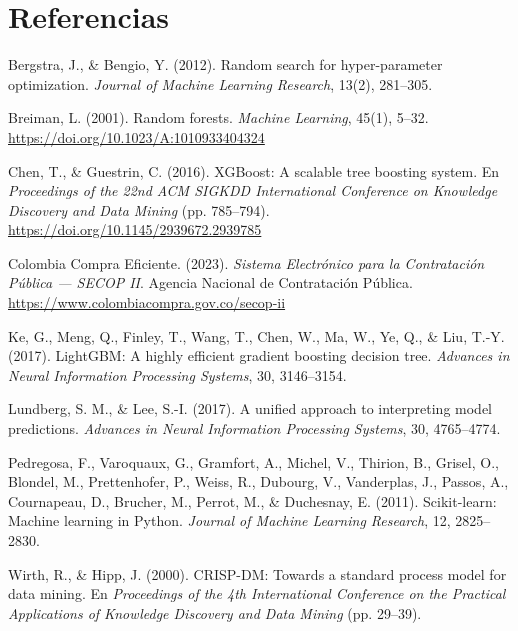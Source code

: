 \documentclass[12pt,letterpaper,oneside]{report}
\begin{document}
\chapter*{Referencias}

\begin{description}[leftmargin=1.27cm,labelindent=0cm,style=nextline]
    \item[] Bergstra, J., \& Bengio, Y. (2012). Random search for
    hyper-parameter optimization. \emph{Journal of Machine Learning Research},
    13(2), 281--305.

    \item[] Breiman, L. (2001). Random forests. \emph{Machine Learning},
    45(1), 5--32. \url{https://doi.org/10.1023/A:1010933404324}

    \item[] Chen, T., \& Guestrin, C. (2016). XGBoost: A scalable tree
    boosting system. En \emph{Proceedings of the 22nd ACM SIGKDD International
    Conference on Knowledge Discovery and Data Mining} (pp. 785--794).
    \url{https://doi.org/10.1145/2939672.2939785}

    \item[] Colombia Compra Eficiente. (2023). \emph{Sistema Electrónico para
    la Contratación Pública --- SECOP II}. Agencia Nacional de Contratación
    Pública. \url{https://www.colombiacompra.gov.co/secop-ii}

    \item[] Ke, G., Meng, Q., Finley, T., Wang, T., Chen, W., Ma, W., Ye, Q.,
    \& Liu, T.-Y. (2017). LightGBM: A highly efficient gradient boosting
    decision tree. \emph{Advances in Neural Information Processing Systems},
    30, 3146--3154.

    \item[] Lundberg, S. M., \& Lee, S.-I. (2017). A unified approach to
    interpreting model predictions. \emph{Advances in Neural Information
    Processing Systems}, 30, 4765--4774.

    \item[] Pedregosa, F., Varoquaux, G., Gramfort, A., Michel, V., Thirion,
    B., Grisel, O., Blondel, M., Prettenhofer, P., Weiss, R., Dubourg, V.,
    Vanderplas, J., Passos, A., Cournapeau, D., Brucher, M., Perrot, M., \&
    Duchesnay, E. (2011). Scikit-learn: Machine learning in Python.
    \emph{Journal of Machine Learning Research}, 12, 2825--2830.

    \item[] Wirth, R., \& Hipp, J. (2000). CRISP-DM: Towards a standard
    process model for data mining. En \emph{Proceedings of the 4th
    International Conference on the Practical Applications of Knowledge
    Discovery and Data Mining} (pp. 29--39).
\end{description}
\end{document}
